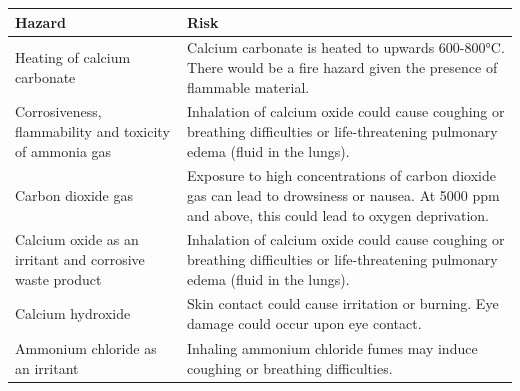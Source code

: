 \documentclass[12pt, a4paper]{article}
\begin{document}
\begin{table}[H]
	\centering
\begin{tabular}{|p{5cm}|p{12cm}|}
	\hline
\textbf{Hazard}                    & \textbf{Risk}                                                                                                                                                                                                          \\  \hline


Heating of calcium carbonate 	  & Calcium carbonate is heated to upwards 600-800°C. There would be a fire hazard given the presence of flammable material.                                                                                                                                                                                                                                                                        \\  \hline
Corrosiveness, flammability and toxicity of ammonia gas                      & Inhalation of calcium oxide could cause coughing or breathing difficulties or life-threatening pulmonary edema (fluid in the lungs). \\  \hline
Carbon dioxide gas               & Exposure to high concentrations of carbon dioxide gas can lead to drowsiness or nausea. At 5000 ppm and above, this could lead to oxygen deprivation.                                                                                                                                                                                                                \\  \hline
Calcium oxide as an irritant and corrosive waste product & Inhalation of calcium oxide could cause coughing or breathing difficulties or life-threatening pulmonary edema (fluid in the lungs).  \\  \hline
Calcium hydroxide                & Skin contact could cause irritation or burning. Eye damage could occur upon eye contact.                                                                                                                                                                                                                                                                                                                   \\  \hline
Ammonium chloride as an irritant              & Inhaling ammonium chloride fumes may induce coughing or breathing difficulties.

\\ \hline                                                 

\end{tabular}
\end{table}
\end{document}
